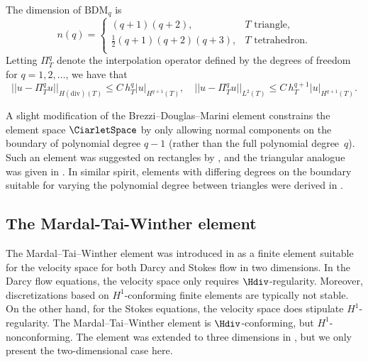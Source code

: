 The dimension of $\mathrm{BDM}_q$ is
\begin{equation}
  n(q) = \left \{
    \begin{array}{ll}
      (q + 1)(q + 2), & T \text{ triangle},  \\
      \frac{1}{2} (q + 1)(q + 2)(q + 3), & T \text{ tetrahedron}.\\
    \end{array}
    \right .
\end{equation}
Letting $\Pi_T^q$ denote the interpolation operator defined by the
degrees of freedom for $q = 1, 2, \dots$, we have that \citep[Chapter
  III.3]{BrezziFortin1991}
\begin{equation}
  ||u - \Pi_T^q u||_{H(\mathrm{div})(T)} \leqslant C \, h_T^{q} |u|_{H^{q+1}(T)}, \quad
  ||u - \Pi_T^q u||_{L^2(T)} \leqslant C \, h_T^{q+1} |u|_{H^{q+1}(T)}.
\end{equation}

A slight modification of the Brezzi--Douglas--Marini element
constrains the element space $\CiarletSpace$ by only allowing normal
components on the boundary of polynomial degree $q - 1$ (rather than
the full polynomial degree~$q$). Such an element was suggested on
rectangles by \citet{BrezziDouglasFortinEtAl1987}, and the triangular
analogue was given in \citet{BrezziFortin1991}. In similar spirit,
elements with differing degrees on the boundary suitable for varying
the polynomial degree between triangles were derived
in \citet{BrezziDouglasMarini1985a}.

\subsection{The Mardal-Tai-Winther element}

The Mardal--Tai--Winther element was introduced
in \citet{MardalTaiWinther2002} as a finite element suitable for the
velocity space for both Darcy and Stokes flow in two dimensions. In
the Darcy flow equations, the velocity space only requires
$\Hdiv$-regularity. Moreover, discretizations based on
$H^1$-conforming finite elements are typically not stable. On the
other hand, for the Stokes equations, the velocity space does
stipulate $H^1$-regularity. The Mardal--Tai--Winther element is
$\Hdiv$-conforming, but $H^1$-nonconforming. The element was extended
to three dimensions in \citet{TaiWinther2006}, but we only present the
two-dimensional case here.

